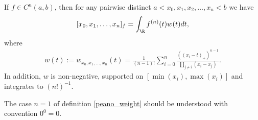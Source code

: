 \begin{lause}\label{peano_theorem}
	If $f \in C^{n}(a, b)$, then for any pairwise distinct $a < x_{0}, x_{1}, x_{2}, \ldots, x_{n} < b$ we have
	\begin{align}\label{peano_identity}
		[x_{0}, x_{1}, \ldots, x_{n}]_{f} = \int_{\R} f^{(n)}(t) w(t) dt,
	\end{align}
	where
	\begin{align}\label{peano_weight}
		w(t) := w_{x_{0}, x_{1}, \ldots, x_{n}}(t) = \frac{1}{(n - 1)!}\sum_{i = 0}^{n} \frac{((x_{i} - t)_{+})^{n - 1}}{\prod_{j \neq i} (x_{i} - x_{j})}.
	\end{align}
	In addition, $w$ is non-negative, supported on $[\min(x_{i}), \max(x_{i})]$ and integrates to $(n!)^{-1}$.
\end{lause}
The case $n = 1$ of definition \ref{peano_weight} should be understood with convention $0^{0} = 0$.
